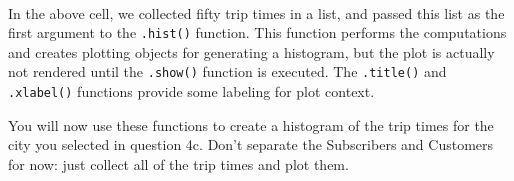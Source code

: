 \documentclass[11pt]{article}
\begin{document}
    \begin{center}
    \end{center}
    { \hspace*{\fill} \\}
    
    In the above cell, we collected fifty trip times in a list, and passed
this list as the first argument to the \texttt{.hist()} function. This
function performs the computations and creates plotting objects for
generating a histogram, but the plot is actually not rendered until the
\texttt{.show()} function is executed. The \texttt{.title()} and
\texttt{.xlabel()} functions provide some labeling for plot context.

You will now use these functions to create a histogram of the trip times
for the city you selected in question 4c. Don't separate the Subscribers
and Customers for now: just collect all of the trip times and plot them.
\end{document}
